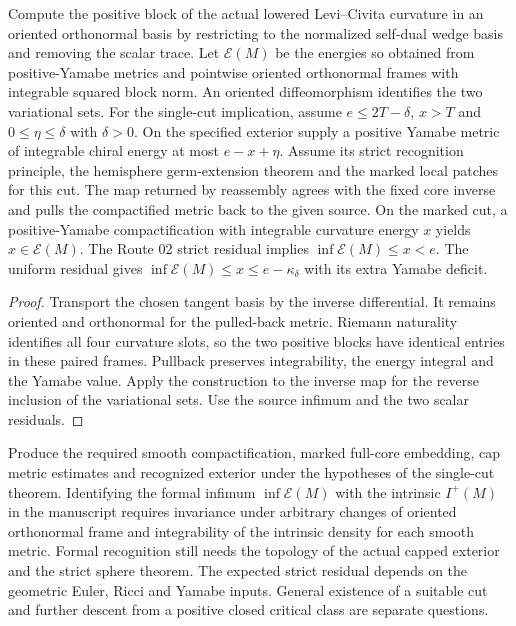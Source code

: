 \begin{theorem}
\label{thm:cut-curvature-descent}
\leanok
Compute the positive block of the actual lowered Levi--Civita curvature
in an oriented orthonormal basis by restricting to the normalized
self-dual wedge basis and removing the scalar trace. Let $\mathcal E(M)$
be the energies so obtained from positive-Yamabe metrics and pointwise
oriented orthonormal frames with integrable squared block norm.
An oriented diffeomorphism identifies the two variational sets.
For the single-cut implication, assume $e\le 2T-\delta$, $x>T$ and
$0\le\eta\le\delta$ with $\delta>0$. On the specified exterior supply a
positive Yamabe metric of integrable chiral energy at most $e-x+\eta$.
Assume its strict recognition principle, the hemisphere germ-extension
theorem and the marked local patches for this cut. The map returned by reassembly agrees with the fixed core inverse
and pulls the compactified metric back to the given source. On the
marked cut, a positive-Yamabe compactification with integrable curvature
energy $x$ yields $x\in\mathcal E(M)$. The Route 02 strict residual
implies $\inf\mathcal E(M)\le x<e$. The uniform residual gives
$\inf\mathcal E(M)\le x\le e-\kappa_\delta$ with its extra Yamabe deficit.
\end{theorem}
\begin{proof}
\leanok
Transport the chosen tangent basis by the inverse differential. It
remains oriented and orthonormal for the pulled-back metric. Riemann
naturality identifies all four curvature slots, so the two positive
blocks have identical entries in these paired frames. Pullback preserves
integrability, the energy integral and the Yamabe value. Apply the
construction to the inverse map for the reverse inclusion of the
variational sets. Use the source infimum and the two scalar residuals.
\end{proof}

\begin{openproblem}
\label{problem:cut-geometric-realization}
\notready
Produce the required smooth compactification, marked full-core embedding,
cap metric estimates and recognized exterior under the hypotheses of the
single-cut theorem. Identifying the formal infimum $\inf\mathcal E(M)$
with the intrinsic $I^+(M)$ in the manuscript requires invariance under
arbitrary changes of oriented orthonormal frame and integrability of the
intrinsic density for each smooth metric. Formal recognition still needs the topology of the
actual capped exterior and the strict sphere theorem. The expected strict
residual depends on the geometric Euler, Ricci and Yamabe inputs. General
existence of a suitable cut and further descent from a positive closed
critical class are separate questions.
\end{openproblem}
